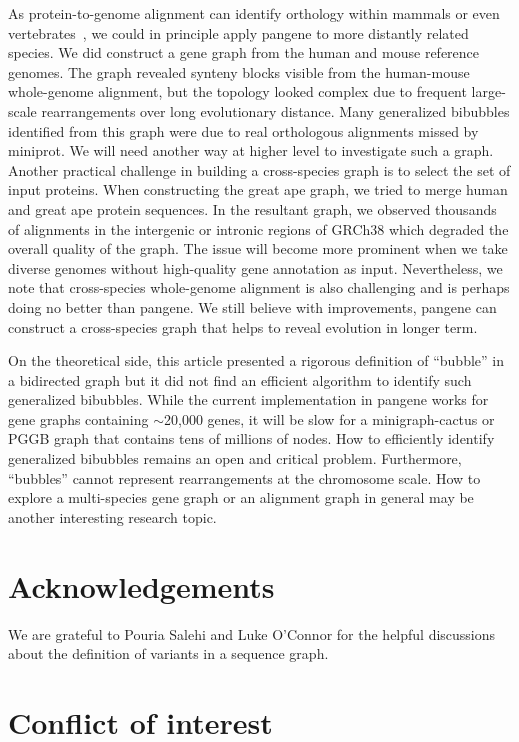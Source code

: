 \documentclass[webpdf,contemporary,large,namedate]{oup-authoring-template}%
\begin{document}
As protein-to-genome alignment can identify orthology within mammals or even vertebrates~\citep{Li:2023ac},
we could in principle apply pangene to more distantly related species.
We did construct a gene graph from the human and mouse reference genomes.
The graph revealed synteny blocks visible from the human-mouse whole-genome alignment,
but the topology looked complex due to frequent large-scale rearrangements over long evolutionary distance.
Many generalized bibubbles identified from this graph were due to real orthologous alignments missed by miniprot.
We will need another way at higher level to investigate such a graph.
Another practical challenge in building a cross-species graph is to select the set of input proteins.
When constructing the great ape graph, we tried to merge human and great ape protein sequences.
In the resultant graph, we observed thousands of alignments in the intergenic or intronic regions of GRCh38
which degraded the overall quality of the graph.
The issue will become more prominent when we take diverse genomes without high-quality gene annotation as input.
Nevertheless, we note that cross-species whole-genome alignment is also challenging and is perhaps doing no better than pangene.
We still believe with improvements, pangene can construct a cross-species graph that helps to reveal evolution in longer term.

On the theoretical side, this article presented a rigorous definition of ``bubble'' in a bidirected graph
but it did not find an efficient algorithm to identify such generalized bibubbles.
While the current implementation in pangene works for gene graphs containing $\sim$20,000 genes,
it will be slow for a minigraph-cactus or PGGB graph that contains tens of millions of nodes.
How to efficiently identify generalized bibubbles remains an open and critical problem.
Furthermore, ``bubbles'' cannot represent rearrangements at the chromosome scale.
How to explore a multi-species gene graph or an alignment graph in general
may be another interesting research topic.

\section*{Acknowledgements}

We are grateful to Pouria Salehi and Luke O'Connor for the helpful discussions about the definition of variants in a sequence graph.

\section*{Conflict of interest}
\end{document}
